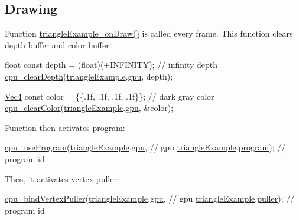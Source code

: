 \hypertarget{triangleExample.c_Drawing}{}\subsection{Drawing}\label{triangleExample.c_Drawing}
Function \hyperlink{triangleExample_8c_adad04513776893b55b58aa0e8a84b8df}{triangle\-Example\-\_\-on\-Draw()} is called every frame. This function clears depth buffer and color buffer\-: 
\begin{DoxyCodeInclude}
  \textcolor{keywordtype}{float} \textcolor{keyword}{const} depth = (float)(+INFINITY);  \textcolor{comment}{// infinity depth}
  \hyperlink{gpu_8h_a988bd18047695141224acfbd2abbe246}{cpu\_clearDepth}(\hyperlink{triangleExample_8c_a235d77635ad30ec86f81d2caabbdc1b5}{triangleExample}.\hyperlink{structTriangleExampleVariables_a6c5c3f82065ae9aac07f9e6f11dd03b3}{gpu}, depth);

  \hyperlink{structVec4}{Vec4} \textcolor{keyword}{const} color = \{\{.1f, .1f, .1f, .1f\}\};  \textcolor{comment}{// dark gray color}
  \hyperlink{gpu_8h_ac8b73f65bb746147b136819e862785ce}{cpu\_clearColor}(\hyperlink{triangleExample_8c_a235d77635ad30ec86f81d2caabbdc1b5}{triangleExample}.\hyperlink{structTriangleExampleVariables_a6c5c3f82065ae9aac07f9e6f11dd03b3}{gpu}, &color);
\end{DoxyCodeInclude}
Function then activates program\-: 
\begin{DoxyCodeInclude}
  \hyperlink{program_8h_a497d97730640942bffcc3cd9f266f146}{cpu\_useProgram}(\hyperlink{triangleExample_8c_a235d77635ad30ec86f81d2caabbdc1b5}{triangleExample}.\hyperlink{structTriangleExampleVariables_a6c5c3f82065ae9aac07f9e6f11dd03b3}{gpu},       \textcolor{comment}{// gpu}
                 \hyperlink{triangleExample_8c_a235d77635ad30ec86f81d2caabbdc1b5}{triangleExample}.\hyperlink{structTriangleExampleVariables_aabf788228d2e91e2718facfbd911c8cc}{program});  \textcolor{comment}{// program id}
\end{DoxyCodeInclude}
Then, it activates vertex puller\-: 
\begin{DoxyCodeInclude}
  \hyperlink{vertexPuller_8h_a27eee6237125ddc21c7d9b996f5af84e}{cpu\_bindVertexPuller}(\hyperlink{triangleExample_8c_a235d77635ad30ec86f81d2caabbdc1b5}{triangleExample}.\hyperlink{structTriangleExampleVariables_a6c5c3f82065ae9aac07f9e6f11dd03b3}{gpu},      \textcolor{comment}{// gpu}
                       \hyperlink{triangleExample_8c_a235d77635ad30ec86f81d2caabbdc1b5}{triangleExample}.\hyperlink{structTriangleExampleVariables_a82e39dd0d18fc57422686229d801e39f}{puller});  \textcolor{comment}{// program id}
\end{DoxyCodeInclude}
